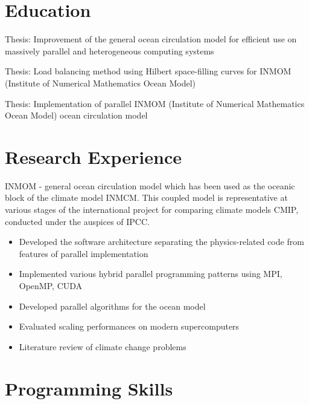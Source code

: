 \documentclass[10pt,a4paper]{moderncv}
\begin{document}
\section{Education}

{Thesis: Improvement of the general ocean circulation model for efficient use on massively parallel and heterogeneous computing systems}

{Thesis: Load balancing method using Hilbert space-filling curves for INMOM
(Institute of Numerical Mathematics Ocean Model)}

{Thesis: Implementation of parallel INMOM (Institute of Numerical Mathematics Ocean Model) ocean circulation model}

\section{Research Experience}

{INMOM - general ocean circulation model which has been used as the oceanic block of the climate model INMCM. This coupled model is representative at various stages of the international project for comparing climate models CMIP, conducted under the auspices of IPCC.
  \begin{itemize}
  \item Developed the software architecture separating the physics-related code from features of parallel implementation
  \item Implemented various hybrid parallel programming patterns using MPI, OpenMP, CUDA
  \item Developed parallel algorithms for the ocean model 
  \item Evaluated scaling performances on modern supercomputers
  \item Literature review of climate change problems
  \end{itemize}
}

\section{Programming Skills}
\end{document}
